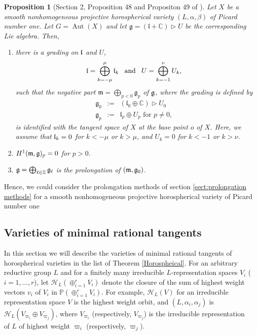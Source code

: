 \documentclass[12pt]{amsart}
\theoremstyle{plain}
\newtheorem{proposition}[theorem]{Proposition}
\theoremstyle{definition}
\def\Aut{\operatorname{Aut}}
\begin{document}
\begin{proposition}[Section 2, Proposition 48 and Propositon 49 of \cite{Ki}]\label{tangentsp of X}
Let $X$ be a smooth nonhomogeneous projective horospherical variety $(L, \alpha, \beta)$ of Picard number one. Let $G=\Aut(X)$ and let $\mathfrak g=(\mathfrak l+\mathbb C) \rhd U$ be the corresponding Lie algebra.
Then,
 \begin{enumerate}
    \item[(1)] there is a grading on $\frak l$ and $U$,
\begin{eqnarray*}
\mathfrak l=\bigoplus_{k=-\mu }^{\mu}\mathfrak l_k \text{ \, and \, }  U=\bigoplus_{k=-1}^{\nu }U_k,
\end{eqnarray*}
such that the negative part $\mathfrak m=\bigoplus_{p<0}\mathfrak g_{p}$ of $\frak g$, where the   grading is defined    by
 \begin{eqnarray*}
 \mathfrak g_0&:=&(\mathfrak l_0\oplus \mathbb C)\rhd U_{ 0} \\
 \mathfrak g_p&:=&\mathfrak l_p \oplus U_{p} \text{ for } p \not=0,
 \end{eqnarray*}
 is identified with the tangent space of $X$ at the base point $o$ of $X$. Here, we assume that $\frak l_k=0$ for $k<-\mu$ or $k > \mu$, and $U_k=0$ for $k <-1$ or $k >\nu$.
 \item[(2)] $H^1(\frak m, \frak g)_{p}=0$ for $p>0$.
 \item[(3)] $\frak g=\bigoplus_{\ell \in \mathbb Z} \frak g_{\ell}$ is the prolongation of $(\frak m, \frak g_0)$.
 \end{enumerate}
\end{proposition}

Hence, we could consider the prolongation methods of section \ref{sect:prolongation methods} for a smooth nonhomogeneous projective horospherical variety of Picard number one

\subsection{Varieties of minimal rational tangents}

In   this section we will describe the varieties of minimal rational tangents of horospherical varieties in the list of Theorem \ref{Horospheical}. For an arbitrary reductive group $L$ and for a finitely many irreducible $L$-representation spaces $V_i$ ($i=1, \dots, r$),  let $\mathcal H_{L}(\oplus_{i=1}^r V_i)$ denote the closure of the sum of highest weight vectors $v_i$ of $V_i$ in $\mathbb P(\oplus_{i=1}^r V_i)$. For example, $\mathcal H_{L}(V)$ for an irreducible representation space $V$ is the highest weight orbit, and $(L, \alpha_i, \alpha_j)$ is $\mathcal H_{L}(V_{\varpi_i} \oplus V_{\varpi_j})$, where $V_{\varpi_i}$ (respectively, $V_{\varpi_j}$) is the irreducible representation of $L$ of highest weight $\varpi_i$ (respectively, $ \varpi_j$).
\end{document}
